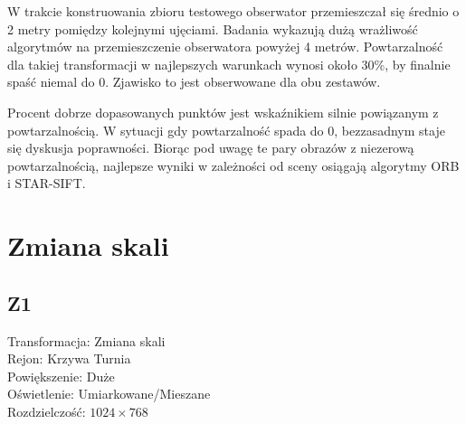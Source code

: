 W trakcie konstruowania zbioru testowego obserwator przemieszczał się średnio o 2 metry pomiędzy kolejnymi ujęciami. Badania wykazują dużą wrażliwość algorytmów na przemieszczenie obserwatora powyżej 4 metrów. Powtarzalność dla takiej transformacji w najlepszych warunkach wynosi około 30\%, by finalnie spaść niemal do 0. Zjawisko to jest obserwowane dla obu zestawów.

Procent dobrze dopasowanych punktów jest wskaźnikiem silnie powiązanym z powtarzalnością. W sytuacji gdy powtarzalność spada do 0, bezzasadnym staje się dyskusja poprawności. Biorąc pod uwagę te pary obrazów z niezerową powtarzalnością, najlepsze wyniki w zależności od sceny osiągają algorytmy ORB i STAR-SIFT.

\FloatBarrier
\newpage
\section{Zmiana skali}
\subsection{Z1}
Transformacja: Zmiana skali\\
Rejon: Krzywa Turnia\\
Powiększenie: Duże\\
Oświetlenie: Umiarkowane/Mieszane\\
Rozdzielczość: $1024 \times 768$

